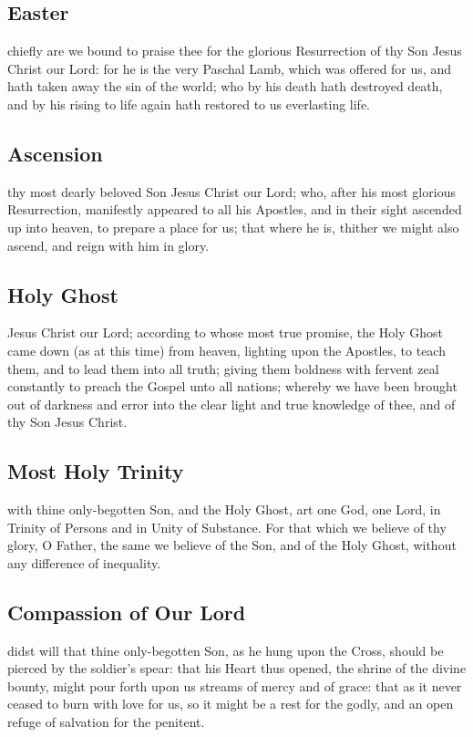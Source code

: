 \begin{multicols}{2}
\subsection{Easter} %
\noindent
{} chiefly are we bound to praise thee for the glorious Resurrection of thy Son Jesus Christ our Lord: for he is the very Paschal Lamb, which was offered for us, and hath taken away the sin of the world; who by his death hath destroyed death, and by his rising to life again hath restored to us everlasting life.

\subsection{Ascension}%
\noindent
{} thy most dearly beloved Son Jesus Christ our Lord; who, after his most glorious Resurrection, manifestly appeared to all his Apostles, and in their sight ascended up into heaven, to prepare a place for us; that where he is, thither we might also ascend, and reign with him in glory.

\subsection{Holy Ghost}%
\noindent
{} Jesus Christ our Lord; according to whose most true promise, the Holy Ghost came down (as at this time) from heaven, lighting upon the Apostles, to teach them, and to lead them into all truth; giving them boldness with fervent zeal constantly to preach the Gospel unto all nations; whereby we have been brought out of darkness and error into the clear light and true knowledge of thee, and of thy Son Jesus Christ.

\subsection{Most Holy Trinity}%
\noindent
{} with thine only-begotten Son, and the Holy Ghost, art one God, one Lord, in Trinity of Persons and in Unity of Substance. For that which we believe of thy glory, O Father, the same we believe of the Son, and of the Holy Ghost, without any difference of inequality.

\subsection{Compassion of Our Lord}%
\noindent
{} didst will that thine only-begotten Son, as he hung upon the Cross, should be pierced by the soldier's spear: that his Heart thus opened, the shrine of the divine bounty, might pour forth upon us streams of mercy and of grace: that as it never ceased to burn with love for us, so it might be a rest for the godly, and an open refuge of salvation for the penitent.


\end{multicols}
